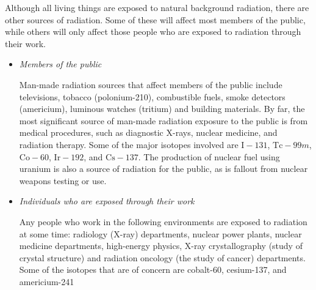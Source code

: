 Although all living things are exposed to natural background radiation, there are other sources of radiation. Some of these will affect most members of the public, while others will only affect those people who are exposed to radiation through their work.

\begin{itemize}
\item{\textit{Members of the public}

Man-made radiation sources that affect members of the public include televisions, tobacco (polonium-210), combustible fuels, smoke detectors (americium), luminous watches (tritium) and building materials. By far, the most significant source of man-made radiation exposure to the public is from medical procedures, such as diagnostic X-rays, nuclear medicine, and radiation therapy. Some of the major isotopes involved are $\text{I}-131$, $\text{Tc}-99m$, $\text{Co}-60$, $\text{Ir}-192$, and $\text{Cs}-137$. The production of nuclear fuel using uranium is also a source of radiation for the public, as is fallout from nuclear weapons testing or use.
}
\item{\textit{Individuals who are exposed through their work}

Any people who work in the following environments are exposed to radiation at some time: radiology (X-ray) departments, nuclear power plants, nuclear medicine departments, high-energy physics, X-ray crystallography (study of crystal structure) and radiation oncology (the study of cancer) departments. Some of the isotopes that are of concern are cobalt-60, cesium-137, and americium-241}
\end{itemize}


% 


